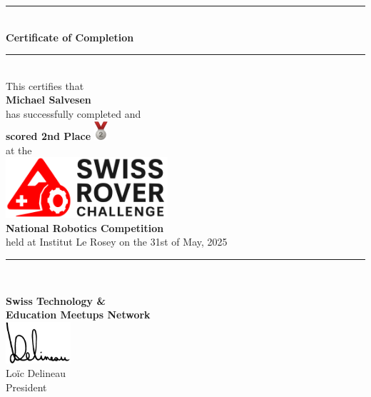 \documentclass[10pt]{article}
\begin{document}
\begin{center}
	\rule{10cm}{0.4pt} \\
	\vspace{1cm}
	{\LARGE \bfseries Certificate of Completion} \\
	\vspace{0.5cm}
	\rule{10cm}{0.4pt} \\
	\vspace{1.5cm}
	{\large This certifies that} \\
	\vspace{1cm}
	{\Huge \bfseries Michael Salvesen} \\
	\vspace{1cm}
	{\large has successfully completed and} \\
	\vspace{0.8cm}
	{\LARGE \bfseries scored 2nd Place}
	\includegraphics[width=0.5cm]{silver.png} \\
	\vspace{1cm}
	{\large at the} \\
	\vspace{1cm}
	\includegraphics[width=6cm]{src.png} \\
	\vspace{1cm}
	{\LARGE \bfseries National Robotics Competition} \\
	\vspace{1cm}
	{\large held at Institut Le Rosey on the 31st of May, 2025} \\
	\vspace{1cm}
	\rule{10cm}{0.4pt} \\
\end{center}

\begin{flushright}
\end{flushright}

\vfill

\begin{center}
	\textbf{Swiss Technology \&} \\
	\textbf{Education Meetups Network} \\
	\vspace{0.3cm}
	\includegraphics[width=2.4cm]{signature-tight.png} \\
	Loïc Delineau \\
	President \\
\end{center}
\end{document}
